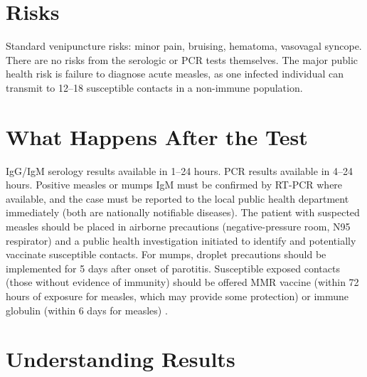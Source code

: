 \section*{Risks}
Standard venipuncture risks: minor pain, bruising, hematoma, vasovagal syncope. There are no risks from the serologic or PCR tests themselves. The major public health risk is failure to diagnose acute measles, as one infected individual can transmit to 12--18 susceptible contacts in a non-immune population.

\section*{What Happens After the Test}
IgG/IgM serology results available in 1--24 hours. PCR results available in 4--24 hours. Positive measles or mumps IgM must be confirmed by RT-PCR where available, and the case must be reported to the local public health department immediately (both are nationally notifiable diseases). The patient with suspected measles should be placed in airborne precautions (negative-pressure room, N95 respirator) and a public health investigation initiated to identify and potentially vaccinate susceptible contacts. For mumps, droplet precautions should be implemented for 5 days after onset of parotitis. Susceptible exposed contacts (those without evidence of immunity) should be offered MMR vaccine (within 72 hours of exposure for measles, which may provide some protection) or immune globulin (within 6 days for measles) \cite{cdc2013prevention}.

\section*{Understanding Results}

